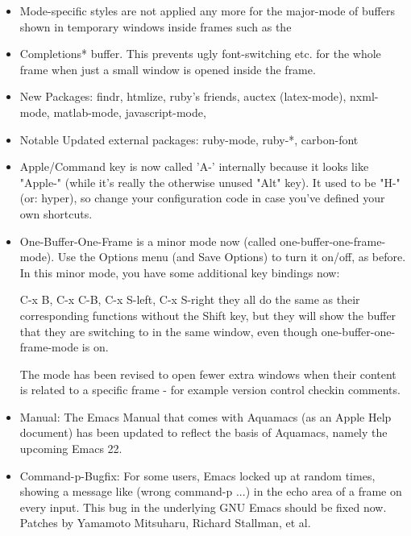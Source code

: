 \begin{itemize}
\item Mode-specific styles are not applied any more for the major-mode
        of buffers shown in temporary windows inside frames such as the
\item Completions* buffer. This prevents ugly font-switching etc. for
        the whole frame when just a small window is opened inside the frame.

\item New Packages: findr, htmlize, ruby's friends, auctex
        (latex-mode), nxml-mode, matlab-mode, javascript-mode,

\item Notable Updated external packages: ruby-mode, ruby-*, carbon-font

\item Apple/Command key is now called 'A-' internally because it looks
        like "Apple-" (while it's really the otherwise unused "Alt" key).
        It used to be "H-" (or: hyper), so change your configuration code
        in case you've defined your own shortcuts.

\item One-Buffer-One-Frame is a minor mode now (called
        one-buffer-one-frame-mode). Use the Options menu (and Save
        Options) to turn it on/off, as before.
        In this minor mode, you have some additional key bindings now:

        C-x B, C-x C-B, C-x S-left, C-x S-right
        they all do the same as their corresponding functions without the
        Shift key, but they will show the buffer that they are switching
        to in the same window, even though one-buffer-one-frame-mode is on.

        The mode has been revised to open fewer extra windows when their
        content is related to a specific frame - for example version
        control checkin comments.

\item Manual: The Emacs Manual that comes with Aquamacs (as an Apple
        Help document) has been updated to reflect the basis of Aquamacs,
        namely the upcoming Emacs 22.

\item Command-p-Bugfix: For some users, Emacs locked up at random
        times, showing a message like (wrong command-p ...) in the echo
        area of a frame on every input. This bug in the underlying GNU
        Emacs should be fixed now.
        Patches by Yamamoto Mitsuharu, Richard Stallman, et al.


\end{itemize}
